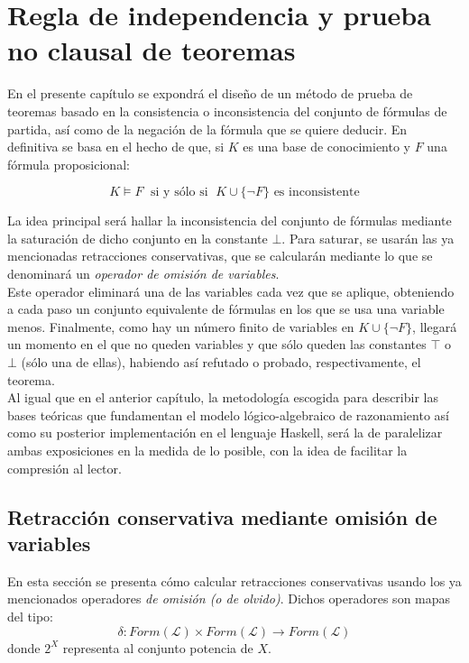 \chapter{Regla de independencia y prueba no clausal de teoremas}

En el presente capítulo se expondrá el diseño de un método de prueba de teoremas basado en la consistencia o inconsistencia del conjunto de fórmulas de partida, así como de la negación de la fórmula que se quiere deducir. En definitiva se basa en el hecho de que, si $K$ es una base de conocimiento y $F$ una fórmula proposicional:

$$K\vDash F \;\text{ si y sólo si }\; K \cup \{ \neg F \} \text{ es inconsistente}$$

La idea principal será hallar la inconsistencia del conjunto de fórmulas mediante la saturación de dicho conjunto en la constante $\bot$. Para saturar, se usarán las ya mencionadas retracciones conservativas,  que se calcularán mediante lo que se denominará un \textit{operador de omisión de variables}. \\

Este operador eliminará una de las variables cada vez que se aplique, obteniendo a cada paso un conjunto equivalente de fórmulas en los que se usa una variable menos. Finalmente, como hay un número finito de variables en $K \cup \{ \neg F \} $, llegará un momento en el que no queden variables y que sólo queden las constantes $\top$ o $\bot$ (sólo una de ellas), habiendo así refutado o probado, respectivamente, el teorema.\\

Al igual que en el anterior capítulo, la metodología escogida para describir las bases teóricas que fundamentan el modelo lógico-algebraico de razonamiento así como su posterior implementación en el lenguaje Haskell, será la de paralelizar ambas exposiciones en la medida de lo posible, con la idea de facilitar la compresión al lector.


\section{Retracción conservativa mediante omisión de variables}
En esta sección se presenta cómo calcular retracciones conservativas usando los ya mencionados operadores \textit{de omisión (o de olvido)}. Dichos operadores son mapas del tipo:
$$\delta : Form(\mathcal{L}) \times Form(\mathcal{L}) \longrightarrow Form(\mathcal{L}) $$
donde $2^X$ representa al conjunto potencia de $X$. 

